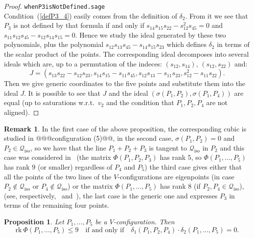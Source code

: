 \documentclass{amsart}
\theoremstyle{plain}
\newtheorem{prop}[lemma]{Proposition}
\theoremstyle{definition}
\newtheorem{rmk}[lemma]{Remark}
\newcommand{\iso}{\mathcal{Q}_{\mathrm{iso}}}
\newcommand{\rk}{\ensuremath{\mathrm{rk}}}
\begin{document}
%
\begin{proof}
\verb+whenP3isNotDefined.sage+\\
Condition~(\ref{defP3_4}) easily comes from the definition of $\delta_2$.
From it we see that $P_3$ is not defined by that formula if and only if
$s_{14}s_{15}s_{22}-s_{12}^2s_{45}=0$ and $s_{11}s_{12}s_{45}-s_{12}s_{14}s_{15}=0$.
Hence we study the ideal generated by these two polynomials, plus the
polynomial $s_{12}s_{13}s_{45}-s_{14}s_{15} s_{23}$ which defines
$\delta_2$ in terms of the scalar product of the points. The corresponding
ideal decomposes into several ideals which are, up to a permutation of
the indeces: $(s_{12}, s_{14})$, $(s_{12}, s_{22})$ and:
\[
J = (s_{13}s_{22} - s_{12}s_{23}, s_{14}s_{15} - s_{11}s_{45}, s_{12}s_{13} -
s_{11}s_{23}, s_{12}^2 - s_{11}s_{22}).
\]
Then we give generic coordinates to the five
points and substitute them into the ideal $J$. It is possible to see that
$J$ and the ideal $(\sigma(P_1, P_2), \sigma(P_1, P_4))$ are equal (up to
saturations w.r.t.\ $v_2$ and the condition that $P_1, P_2, P_4$ are not
aligned). 
\end{proof}
%
\begin{rmk}
In the first case of the above proposition, the corresponding cubic 
is studied in @@@configuration (5)@@, in the
second case, $\sigma(P_1, P_2) = 0$ and $P_2\in \iso$, so
we have that the line $P_1+P_2+P_3$ is tangent to $\iso$ in $P_2$
and this case was considered in~
(the matrix $\Phi(P_1, P_2, P_3)$ has rank $5$, so
$\Phi(P_1, \dots, P_5)$ has rank $9$ (or smaller) regardless of
$P_4$ and $P_5$)
the third case gives either that all the
points of the two lines of the $V$-configurations are eigenpoints (in case
$P_2 \not\in \iso$ or $P_4 \not\in \iso$) or the matrix $\Phi(P_1, \dots, P_5)$
has rank $8$ (if $P_2, P_4 \in \iso$), (see, respectively,~
and~),
the last case is the generic one and expresses $P_3$ in terms of the remaining
four points.
\end{rmk}
%
\begin{prop}
\label{prop:d1d2}
Let $P_1, \dots, P_5$ be a $V$-configuration. Then
\[
\rk \ \Phi(P_1, \dots, P_5) \leq 9
\quad \mbox{
if and only if} \quad
\delta_1(P_1, P_2, P_4) \cdot \delta_2(P_1, \dots, P_5) = 0.
\]
\end{prop}
\end{document}
